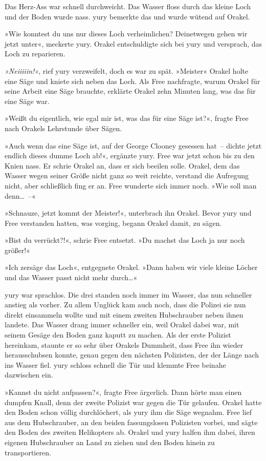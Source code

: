Das Herz-Ass war schnell durchweicht. Das Wasser floss durch das kleine Loch und der Boden wurde nass. yury bemerkte das und wurde wütend auf Orakel.

»Wie konntest du uns nur dieses Loch verheimlichen? Deinetwegen gehen wir jetzt unter«, meckerte yury. Orakel entschuldigte sich bei yury und versprach, das Loch zu reparieren.

\textit{»Neiiiiin!«}, rief yury verzweifelt, doch es war zu spät. »Meister« Orakel holte eine Säge und kniete sich neben das Loch. Als Free nachfragte, warum Orakel für seine Arbeit eine Säge brauchte, erklärte Orakel zehn Minuten lang, was das für eine Säge war.

»Weißt du eigentlich, wie egal mir ist, was das für eine Säge ist?«, fragte Free nach Orakels Lehrstunde über Sägen.

»Auch wenn das eine Säge ist, auf der George Clooney gesessen hat~– dichte jetzt endlich dieses dumme Loch ab!«, ergänzte yury. Free war jetzt schon bis zu den Knien nass. Er schrie Orakel an, dass er sich beeilen solle. Orakel, dem das Wasser wegen seiner Größe nicht ganz so weit reichte, verstand die Aufregung nicht, aber schließlich fing er an. Free wunderte sich immer noch. »Wie soll man denn…~–«

»Schnauze, jetzt kommt der Meister!«, unterbrach ihn Orakel. Bevor yury und Free verstanden hatten, was vorging, begann Orakel damit, zu sägen.

»Bist du verrückt?!«, schrie Free entsetzt. »Du machst das Loch ja nur noch größer!«

»Ich zersäge das Loch«, entgegnete Orakel. »Dann haben wir viele kleine Löcher und das Wasser passt nicht mehr durch…«

yury war sprachlos. Die drei standen noch immer im Wasser, das nun schneller anstieg als vorher. Zu allem Unglück kam auch noch, dass die Polizei sie nun direkt einsammeln wollte und mit einem zweiten Hubschrauber neben ihnen landete. Das Wasser drang immer schneller ein, weil Orakel dabei war, mit seinem Gesäge den Boden ganz kaputt zu machen. Als der erste Polizist hereinkam, staunte er so sehr über Orakels Dummheit, dass Free ihn wieder herausschubsen konnte, genau gegen den nächsten Polizisten, der der Länge nach ins Wasser fiel. yury schloss schnell die Tür und klemmte Free beinahe dazwischen ein.

»Kannst du nicht aufpassen?«, fragte Free ärgerlich. Dann hörte man einen dumpfen Knall, denn der zweite Polizist war gegen die Tür gelaufen. Orakel hatte den Boden schon völlig durchlöchert, als yury ihm die Säge wegnahm. Free lief aus dem Hubschrauber, an den beiden fassungslosen Polizisten vorbei, und sägte den Boden des zweiten Helikopters ab. Orakel und yury halfen ihm dabei, ihren eigenen Hubschrauber an Land zu ziehen und den Boden hinein zu transportieren.

